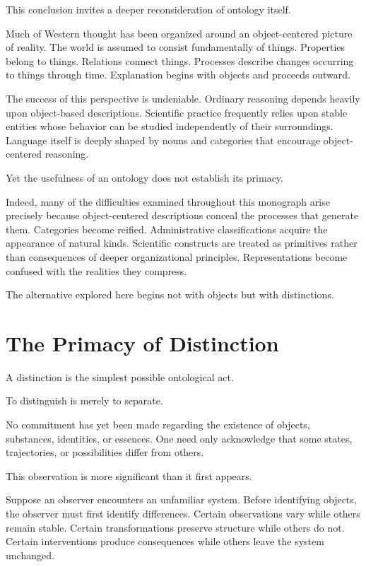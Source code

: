\documentclass[11pt,oneside,openany]{book}
\begin{document}
This conclusion invites a deeper reconsideration of ontology itself.

Much of Western thought has been organized around an object-centered picture of reality. The world is assumed to consist fundamentally of things. Properties belong to things. Relations connect things. Processes describe changes occurring to things through time. Explanation begins with objects and proceeds outward.

The success of this perspective is undeniable. Ordinary reasoning depends heavily upon object-based descriptions. Scientific practice frequently relies upon stable entities whose behavior can be studied independently of their surroundings. Language itself is deeply shaped by nouns and categories that encourage object-centered reasoning.

Yet the usefulness of an ontology does not establish its primacy.

Indeed, many of the difficulties examined throughout this monograph arise precisely because object-centered descriptions conceal the processes that generate them. Categories become reified. Administrative classifications acquire the appearance of natural kinds. Scientific constructs are treated as primitives rather than consequences of deeper organizational principles. Representations become confused with the realities they compress.

The alternative explored here begins not with objects but with distinctions.

\section{The Primacy of Distinction}

A distinction is the simplest possible ontological act.

To distinguish is merely to separate.

No commitment has yet been made regarding the existence of objects, substances, identities, or essences. One need only acknowledge that some states, trajectories, or possibilities differ from others.

This observation is more significant than it first appears.

Suppose an observer encounters an unfamiliar system. Before identifying objects, the observer must first identify differences. Certain observations vary while others remain stable. Certain transformations preserve structure while others do not. Certain interventions produce consequences while others leave the system unchanged.
\end{document}
